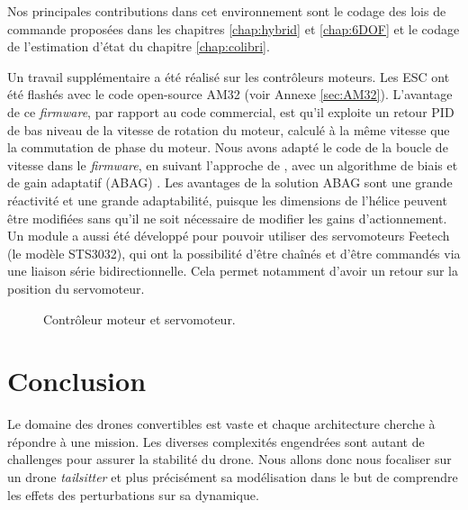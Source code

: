 Nos principales contributions dans cet environnement sont le codage des lois de commande proposées dans les chapitres \ref{chap:hybrid} et \ref{chap:6DOF} et le codage de l'estimation d'état du chapitre \ref{chap:colibri}. 

Un travail supplémentaire a été réalisé sur les contrôleurs moteurs. Les ESC ont été flashés avec le code open-source AM32 (voir Annexe \ref{sec:AM32}). L'avantage de ce \textit{firmware}, par rapport au code commercial, est qu'il exploite un retour PID  de bas niveau de la vitesse de rotation du moteur, calculé à la même vitesse que la commutation de phase du moteur. Nous avons adapté le code de la boucle de vitesse dans le \textit{firmware}, en suivant l'approche de \cite{franchi2017}, avec un algorithme de biais et de gain adaptatif (ABAG) . Les avantages de la solution ABAG sont une grande réactivité et une grande adaptabilité, puisque les dimensions de l'hélice peuvent être modifiées sans qu'il ne soit nécessaire de modifier les gains d'actionnement.
Un module a aussi été développé pour pouvoir utiliser des servomoteurs Feetech (le modèle STS3032), qui ont la possibilité d'être chaînés et d'être commandés via une liaison série bidirectionnelle. Cela permet notamment d'avoir un retour sur la position du servomoteur.

\begin{figure}[ht!]
    \centering
    \caption{Contrôleur moteur et servomoteur.}
    \label{fig:ESCServo}
\end{figure}




\section{Conclusion}
Le domaine des drones convertibles est vaste et chaque architecture cherche à répondre à une mission. Les diverses complexités engendrées sont autant de challenges pour assurer la stabilité du drone. Nous allons donc nous focaliser sur un drone \textit{tailsitter} et plus précisément sa modélisation dans le but de comprendre les effets des perturbations sur sa dynamique.